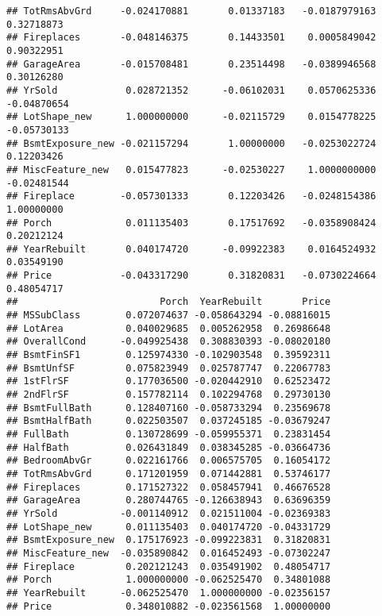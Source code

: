 \documentclass[]{article}
\begin{document}
\begin{verbatim}
## TotRmsAbvGrd     -0.024170881       0.01337183   -0.0187979163  0.32718873
## Fireplaces       -0.048146375       0.14433501    0.0005849042  0.90322951
## GarageArea       -0.015708481       0.23514498   -0.0389946568  0.30126280
## YrSold            0.028721352      -0.06102031    0.0570625336 -0.04870654
## LotShape_new      1.000000000      -0.02115729    0.0154778225 -0.05730133
## BsmtExposure_new -0.021157294       1.00000000   -0.0253022724  0.12203426
## MiscFeature_new   0.015477823      -0.02530227    1.0000000000 -0.02481544
## Fireplace        -0.057301333       0.12203426   -0.0248154386  1.00000000
## Porch             0.011135403       0.17517692   -0.0358908424  0.20212124
## YearRebuilt       0.040174720      -0.09922383    0.0164524932  0.03549190
## Price            -0.043317290       0.31820831   -0.0730224664  0.48054717
##                         Porch  YearRebuilt       Price
## MSSubClass        0.072074637 -0.058643294 -0.08816015
## LotArea           0.040029685  0.005262958  0.26986648
## OverallCond      -0.049925438  0.308830393 -0.08020180
## BsmtFinSF1        0.125974330 -0.102903548  0.39592311
## BsmtUnfSF         0.075823949  0.025787747  0.22067783
## 1stFlrSF          0.177036500 -0.020442910  0.62523472
## 2ndFlrSF          0.157782114  0.102294768  0.29730130
## BsmtFullBath      0.128407160 -0.058733294  0.23569678
## BsmtHalfBath      0.022503507  0.037245185 -0.03679247
## FullBath          0.130728699 -0.059955371  0.23831454
## HalfBath          0.026431849  0.038345285 -0.03664736
## BedroomAbvGr      0.022161766  0.006575705  0.16054172
## TotRmsAbvGrd      0.171201959  0.071442881  0.53746177
## Fireplaces        0.171527322  0.058457941  0.46676528
## GarageArea        0.280744765 -0.126638943  0.63696359
## YrSold           -0.001140912  0.021511004 -0.02369383
## LotShape_new      0.011135403  0.040174720 -0.04331729
## BsmtExposure_new  0.175176923 -0.099223831  0.31820831
## MiscFeature_new  -0.035890842  0.016452493 -0.07302247
## Fireplace         0.202121243  0.035491902  0.48054717
## Porch             1.000000000 -0.062525470  0.34801088
## YearRebuilt      -0.062525470  1.000000000 -0.02356157
## Price             0.348010882 -0.023561568  1.00000000
\end{verbatim}
\end{document}
